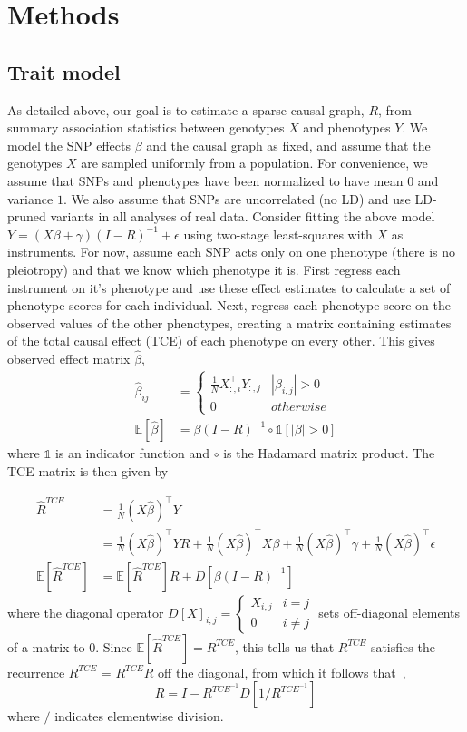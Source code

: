 \documentclass{article}
\begin{document}
\section{Methods}\label{methods}
\subsection{Trait model}
As detailed above, our goal is to estimate a sparse causal graph, $R$, from
summary association statistics between genotypes $X$ and phenotypes $Y$. We model
the SNP effects $\beta$ and the causal graph as fixed, and assume that the genotypes
$X$ are sampled uniformly from a population. For convenience, we assume that SNPs
 and phenotypes have been normalized
 to have mean $0$ and variance $1$. We also assume that SNPs are uncorrelated (no LD)
and use LD-pruned variants in all analyses of real data.
Consider fitting the above model $Y = (X\beta + \gamma)(I-R)^{-1} + \epsilon$
using two-stage least-squares with $X$ as instruments. For now,
 assume each SNP acts only on one phenotype
(there is no pleiotropy) and that we know which phenotype it is.
First regress each instrument on it's phenotype and use these effect
 estimates to calculate a set of phenotype scores for each individual.
Next, regress each phenotype score on the observed values of the other phenotypes,
 creating a matrix containing estimates of the total causal effect (TCE) of
 each phenotype on every other. This gives observed effect matrix $\hat{\beta}$,
\begin{align*}
\hat{\beta}_{ij} &= \left\{
 \begin{array}{ll}
  \frac{1}{N} X_{:, i}^{\top}Y_{:,j} & |\beta_{i,j}| > 0 \\
  0 & otherwise
 \end{array} \right. \\
 \mathbb{E}[\hat{\beta} ] &= \beta (I-R)^{-1} \circ \mathds{1}[|\beta| > 0]
\end{align*}
where $\mathds{1}$ is an indicator function and $\circ$ is the Hadamard matrix
product. The TCE matrix is then given by

\begin{align*}
\hat{R}^{TCE} &= \frac{1}{N} (X\hat{\beta})^{\top} Y \\
  &= \frac{1}{N} (X\hat{\beta})^{\top} Y R + \frac{1}{N}(X\hat{\beta})^{\top} X \beta +
     \frac{1}{N}(X\hat{\beta})^{\top} \gamma + \frac{1}{N}(X\hat{\beta})^{\top} \epsilon \\
\mathbb{E}[\hat{R}^{TCE}]  &= \mathbb{E}[\hat{R}^{TCE}] R + D[\beta (I-R)^{-1}]
\end{align*}
where the diagonal operator $D[X]_{i,j} = \left\{ \begin{array}{ll}
  X_{i,j} & i=j \\ 0 & i \neq j \end{array} \right.$ sets off-diagonal elements
  of a matrix to 0.
  Since $\mathbb{E}[\hat{R}^{TCE}] =R^{TCE}$,
this tells us that $R^{TCE}$ satisfies the recurrence
  $R^{TCE}$ = $R^{TCE} R$ off the diagonal, from
  which it follows that~\cite{Pachter},
\begin{equation}\label{r_cde}
R = I - R^{TCE^{-1}} D[1 / R^{TCE^{-1}}]
\end{equation}
where $/$ indicates elementwise division.
\end{document}
